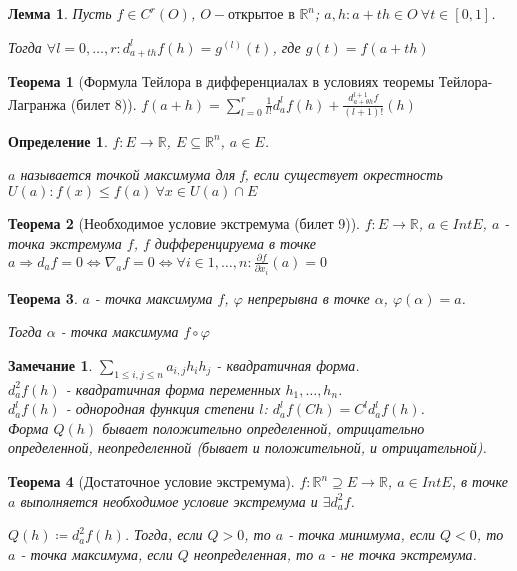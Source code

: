 \documentclass[11pt,a4paper,oneside]{scrartcl}
\newtheorem{definition}{Определение}
\newtheorem{lemma}{Лемма}
\newtheorem{theorem}{Теорема}
\newtheorem*{remark}{Замечание}
\begin{document}
\begin{lemma}
    Пусть $f \in C^r (O)$, $O - \text{открытое в } \mathbb{R}^n$;
    $a, h: a+th \in O \ \forall t \in [0, 1]$.

    Тогда $\forall l = 0, \dots, r: d_{a+th}^l f(h) = g^{(l)} (t)$, где $g(t) = f(a+th)$
\end{lemma}

\begin{theorem}[Формула Тейлора в дифференциалах в условиях теоремы Тейлора-Лагранжа (билет 8)]
    $f(a+h) = \sum_{l=0}^r \frac{1}{l!} d_a^l f(h) + \frac{d^{l+1}_{a + \theta h} f}{(l + 1)!}(h)$
\end{theorem}

\begin{definition}
    $f: E \rightarrow \mathbb{R}$, $E \subseteq \mathbb{R}^n$, $a \in E$.

    $a$ называется точкой максимума для f, если существует окрестность
        $U(a): f(x) \leq f(a) \ \forall x \in U(a) \cap E$
\end{definition}

\begin{theorem}[Необходимое условие экстремума (билет 9)]
    $f: E \rightarrow \mathbb{R}$, $a \in Int E$, $a$ - точка экстремума $f$,
    $f$ дифференцируема в точке $a \Rightarrow d_a f = 0
    \Leftrightarrow \nabla_a f = 0
    \Leftrightarrow \forall i \in {1, \dots, n} : \frac{\partial f}{\partial x_i}(a) = 0$
\end{theorem}

\begin{theorem}
    $a$ - точка максимума $f$, $\varphi$ непрерывна в точке $\alpha$, $\varphi(\alpha) = a$.

    Тогда $\alpha$ - точка максимума $f \circ \varphi$
\end{theorem}

\begin{remark}
    $\sum_{1 \leq i, j \leq n} a_{i,j} h_i h_j$ - квадратичная форма. \\
    $d_a^2 f(h)$ - квадратичная форма переменных $h_1, \dots, h_n$. \\
    $d_a^l f(h)$ - однородная функция степени $l$: $d_a^l f(Ch) = C^l d_a^l f(h)$. \\
    Форма $Q(h)$ бывает положительно определенной, отрицательно определенной,
    неопределенной (бывает и положительной, и отрицательной).
\end{remark}

\begin{theorem}[Достаточное условие экстремума]
    $f: \mathbb{R}^n \supseteq E \rightarrow \mathbb{R}$, $a \in Int E$,
    в точке $a$ выполняется необходимое условие экстремума и $\exists d_a^2 f$.

    $Q(h) \coloneqq d_a^2 f(h)$. Тогда, если $Q > 0$, то $a$ - точка минимума,
    если $Q < 0$, то $a$ - точка максимума,
    если $Q$ неопределенная, то $a$ - не точка экстремума.
\end{theorem}
\end{document}
